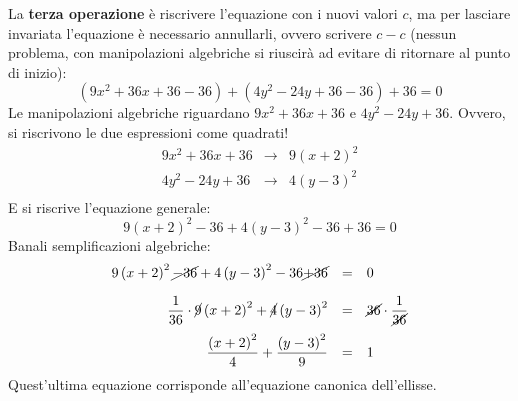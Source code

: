 \documentclass[a4paper]{article}
\begin{document}
\begin{mdframed}
		\noindent
		La \textbf{terza operazione} è riscrivere l'equazione con i nuovi valori $c$, ma per lasciare invariata l'equazione è necessario annullarli, ovvero scrivere $c-c$ (nessun problema, con manipolazioni algebriche si riuscirà ad evitare di ritornare al punto di inizio):
		\begin{equation*}
			\left(9x^{2} + 36x + 36 - 36\right) + \left(4y^{2} - 24y + 36 - 36\right) + 36 = 0
		\end{equation*}
		Le manipolazioni algebriche riguardano $9x^{2} + 36x + 36$ e $4y^{2} - 24y + 36$. Ovvero, si riscrivono le due espressioni come quadrati!
		\begin{equation*}
			\begin{array}{rcl}
				9x^{2} + 36x + 36 &\longrightarrow& 9\left(x+2\right)^{2} \\
				4y^{2} - 24y + 36 &\longrightarrow& 4\left(y-3\right)^{2} \\
			\end{array}
		\end{equation*}
		E si riscrive l'equazione generale:
		\begin{equation*}
			9\left(x+2\right)^{2} - 36 + 4\left(y-3\right)^{2} - 36 + 36 = 0
		\end{equation*}
		Banali semplificazioni algebriche:
		\begin{equation*}
			\begin{array}{rcl}
				9\left(x+2\right)^{2} \cancel{- 36} + 4\left(y-3\right)^{2} - 36 \cancel{+ 36} &=& 0 \\ [1em]
				\dfrac{1}{36} \cdot \cancel{9}\left(x+2\right)^{2} + \cancel{4}\left(y-3\right)^{2} &=& \cancel{36} \cdot \dfrac{1}{\cancel{36}}  \\ [1em]
				\dfrac{\left(x+2\right)^{2}}{4} + \dfrac{\left(y-3\right)^{2}}{9} &=& 1
			\end{array}
		\end{equation*}
		Quest'ultima equazione corrisponde all'equazione canonica dell'ellisse.	
	\end{mdframed}
\end{document}
